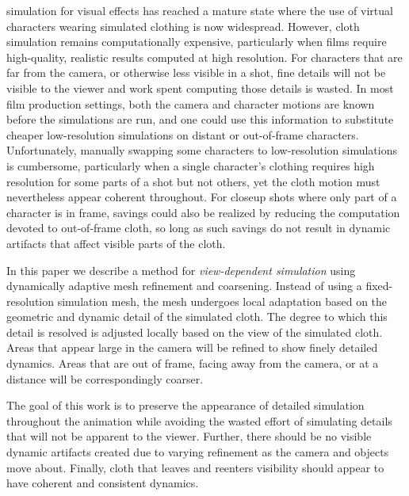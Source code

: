 \documentclass[10pt,journal,compsoc,twoside]{TexInputs/IEEEtran}
\begin{document}




simulation for visual effects has reached a mature state where the use of
virtual characters wearing simulated clothing is now widespread. However, cloth
simulation remains computationally expensive, particularly when films require
high-quality, realistic results computed at high resolution. For characters
that are far from the camera, or otherwise less visible in a shot, fine details
will not be visible to the viewer and work spent computing those details is
wasted. In most film production settings, both the camera and character motions
are known before the simulations are run, and one could use this information to
substitute cheaper low-resolution simulations on distant or out-of-frame
characters. Unfortunately, manually swapping some characters to low-resolution
simulations is cumbersome, particularly when a single character's clothing
requires high resolution for some parts of a shot but not others, yet the cloth
motion must nevertheless appear coherent throughout. For closeup shots where
only part of a character is in frame, savings could also be realized by
reducing the computation devoted to out-of-frame cloth, so long as such savings
do not result in dynamic artifacts that affect visible parts of the cloth.

In this paper we describe a method for \textit{view-dependent simulation} using
dynamically adaptive mesh refinement and coarsening.  Instead of using
a fixed-resolution simulation mesh, the mesh undergoes local
adaptation based on the geometric and dynamic detail of the simulated
cloth. The degree to which this detail is resolved is adjusted locally
based on the view of the simulated cloth.  Areas that appear large
in the camera will be refined to show finely detailed dynamics.  Areas
that are out of frame, facing away from the camera, or at a distance
will be correspondingly coarser.

The goal of this work is to preserve the appearance of detailed
simulation throughout the animation while avoiding the wasted effort
of simulating details that will not be apparent to the viewer.
Further, there should be no visible dynamic artifacts created due to
varying refinement as the camera and objects move about.  Finally,
cloth that leaves and reenters visibility should appear to have
coherent and consistent dynamics.
\end{document}
